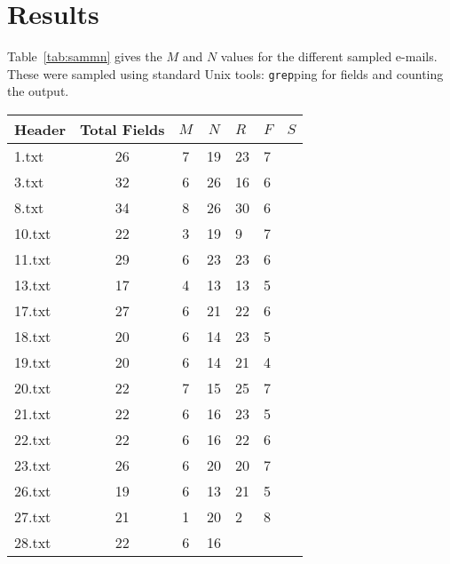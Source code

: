 

\section{Results}

Table~\ref{tab:sammn} gives the $M$ and $N$ values for the different sampled
e-mails.  These were sampled using standard Unix tools: \texttt{grep}ping for
fields and counting the output.

\begin{table}[]
\centering
\begin{tabular}{@{}lccclll@{}}
\toprule
Header & Total Fields &                  $M$  & $N$  & $R$ & $F$ & $S$ \\ \midrule
1.txt  & 26           & 7                     & 19   & 23  & 7   &     \\
3.txt  & 32           & 6                     & 26   & 16  & 6   &     \\
8.txt  & 34           & 8                     & 26   & 30  & 6   &     \\
10.txt & 22           & 3                     & 19   & 9   & 7   &     \\
11.txt & 29           & 6                     & 23   & 23  & 6   &     \\
13.txt & 17           & 4                     & 13   & 13  & 5   &     \\
17.txt & 27           & 6                     & 21   & 22  & 6   &     \\
18.txt & 20           & 6                     & 14   & 23  & 5   &     \\
19.txt & 20           & 6                     & 14   & 21  & 4   &     \\
20.txt & 22           & 7                     & 15   & 25  & 7   &     \\
21.txt & 22           & 6                     & 16   & 23  & 5   &     \\
22.txt & 22           & 6                     & 16   & 22  & 6   &     \\
23.txt & 26           & 6                     & 20   & 20  & 7   &     \\
26.txt & 19           & 6                     & 13   & 21  & 5   &     \\
27.txt & 21           & 1                     & 20   & 2   & 8   &     \\
28.txt & 22           & 6                     & 16   &     &     &     \\

\end{tabular}
\end{table}
